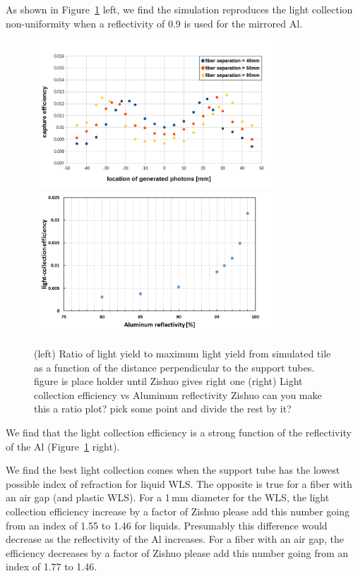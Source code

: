 \documentclass[review]{elsarticle}
\begin{document}
As shown in Figure~\ref{fig:simeff} left, we find the simulation
reproduces the light collection non-uniformity when a reflectivity of
0.9 is used for the mirrored Al.

\begin{figure}[!ht]
\begin{center}
\includegraphics[width=0.8\textwidth]{./figures/geant_result_uniformity.png}
\includegraphics[width=0.8\textwidth]{./figures/geant_result_reflectivity.png}
\caption{(left) Ratio of light yield to maximum light yield from
  simulated tile as a function of the distance perpendicular to the
  support tubes. {\color{red} figure is place holder until Zishuo
    gives right one} (right) Light collection efficiency vs Aluminum
  reflectivity {\color{red} Zishuo can you make this a ratio plot?
    pick some point and divide the rest by it?} }
\label{fig:simeff}
\end{center}
\end{figure}

We find that the light collection efficiency is a strong function of
the reflectivity of the Al (Figure~\ref{fig:simeff} right).

We find the best light collection comes when the support tube has the
lowest possible index of refraction for liquid WLS. The opposite is
true for a fiber with an air gap (and plastic WLS). For a 1\,mm
diameter for the WLS, the light collection efficiency increase by a
factor of {\color{red} Zishuo please add this number} going from an
index of 1.55 to 1.46 for liquids. Presumably this difference would
decrease as the reflectivity of the Al increases. For a fiber with an
air gap, the efficiency decreases by a factor of {\color{red} Zishuo
 please add this number} going from an index of 1.77 to 1.46.
\end{document}
